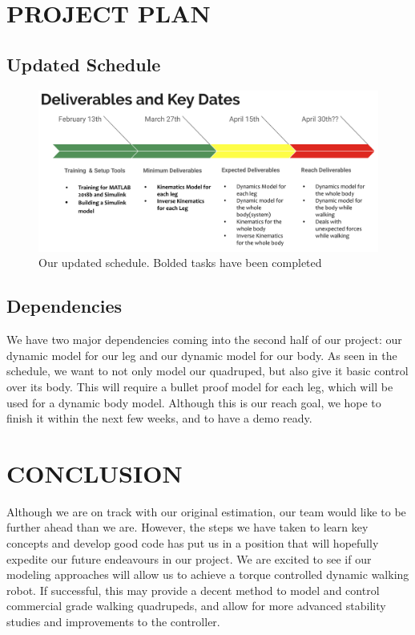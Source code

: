 \documentclass[letterpaper, 10 pt, conference]{ieeeconf}  %
\begin{document}
\section{PROJECT PLAN}
\subsection{Updated Schedule}
    \begin{figure}[thpb]
        \parbox{\linewidth}{\includegraphics[width=\linewidth]{UpdatedSchedule.png}}
        \caption{Our updated schedule. Bolded tasks have been completed}
        \label{fig:updatedschedule}
    \end{figure}
\subsection{Dependencies}
We have two major dependencies coming into the second half of our project: our dynamic model for our leg and our dynamic model for our body. As seen in the schedule, we want to not only model our quadruped, but also give it basic control over its body. This will require a bullet proof model for each leg, which will be used for a dynamic body model. Although this is our reach goal, we hope to finish it within the next few weeks, and to have a demo ready.

\section{CONCLUSION}
Although we are on track with our original estimation, our team would like to be further ahead than we are. However, the steps we have taken to learn key concepts and develop good code has put us in a position that will hopefully expedite our future endeavours in our project. We are excited to see if our modeling approaches will allow us to achieve a torque controlled dynamic walking robot. If successful, this may provide a decent method to model and control commercial grade walking quadrupeds, and allow for more advanced stability studies and improvements to the controller.
\end{document}
